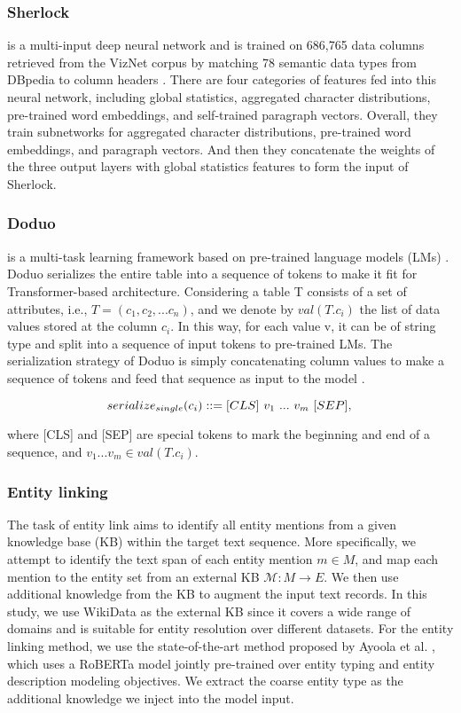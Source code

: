 \subsubsection{Sherlock} is a multi-input deep neural network and is trained on 686,765 data columns retrieved from the VizNet corpus by matching 78 semantic data types from DBpedia to column headers \cite{hulsebos_sherlock_2019}. There are four categories of features fed into this neural network, including global statistics, aggregated character distributions, pre-trained word embeddings, and self-trained paragraph vectors. Overall, they train subnetworks for aggregated character distributions, pre-trained word embeddings, and paragraph vectors. And then they concatenate the weights of the three output layers with global statistics features to form the input of Sherlock. 

\subsubsection{Doduo} is a multi-task learning framework based on pre-trained language models (LMs) \cite{suhara_annotating_2022}. Doduo serializes the entire table into a sequence of tokens to make it fit for Transformer-based architecture. Considering a table T consists of a set of attributes, i.e., $T= (c_1, c_2,... c_n)$, and we denote by  $val(T.c_i)$ the list of data values stored at the column $c_i$. In this way, for each value v, it can be of string type and split into a sequence of input tokens to pre-trained LMs. The serialization strategy of Doduo is simply concatenating column values to make a sequence of tokens and feed that sequence as input to the model \cite{suhara_annotating_2022}. 

\begin{equation}
    serialize_{single}(c_i) ::= [CLS]\ v_1\ ...\ v_m\ [SEP], \\ 
\end{equation}

where [CLS] and [SEP] are special tokens to mark the beginning and end of a sequence, and ${v_1 ... v_m} \in val(T.c_i)$.


\subsubsection{Entity linking}
The task of entity link aims to identify all entity mentions from a given knowledge base (KB) within the target text sequence. More specifically, we attempt to identify the text span of each entity mention $m \in M$, and map each mention to the entity set from an external KB $\mathcal{M}: M \rightarrow E$. 
We then use additional knowledge from the KB to augment the input text records.
In this study, we use WikiData as the external KB since it covers a wide range of domains and is suitable for entity resolution over different datasets. For the entity linking method, we use the state-of-the-art method proposed by Ayoola et al. \cite{ayoola_refined_2022}, which uses a RoBERTa model jointly pre-trained over entity typing and entity description modeling objectives. We extract the coarse entity type as the additional knowledge we inject into the model input.

